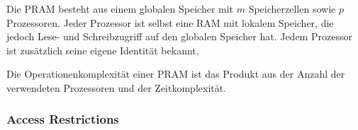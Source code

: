 Die PRAM besteht aus einem globalen Speicher mit $m$ Speicherzellen sowie $p$ Prozessoren.
Jeder Prozessor ist selbst eine RAM mit lokalem Speicher, die jedoch Lese- und Schreibzugriff auf den globalen Speicher hat.
Jedem Prozessor ist zusätzlich seine eigene Identität bekannt,

Die Operationenkomplexität einer PRAM ist das Produkt aus der Anzahl der verwendeten Prozessoren und der Zeitkomplexität.


\subsubsection{Access Restrictions}
